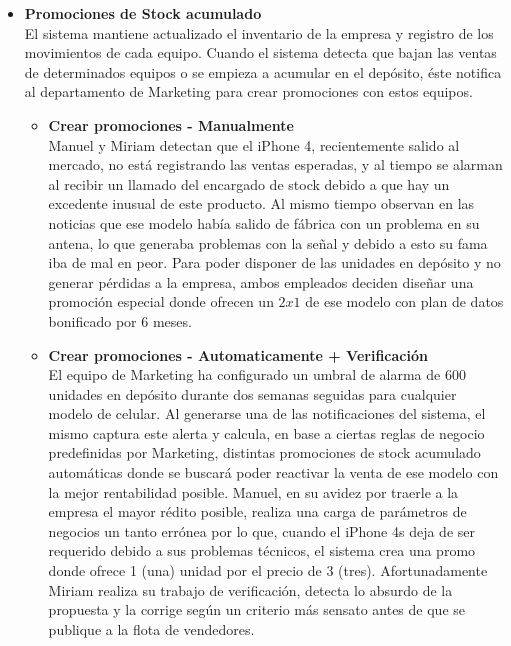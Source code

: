 \begin{itemize}
  \item \textbf{Promociones de Stock acumulado} \\
    El sistema mantiene actualizado el inventario de la empresa y registro de los movimientos de cada equipo. Cuando el sistema detecta que bajan las ventas de determinados equipos o se empieza a acumular en el depósito, éste notifica al departamento de Marketing para crear promociones con estos equipos.
  \begin{itemize}
    \item \textbf{Crear promociones - Manualmente} \\
      Manuel y Miriam detectan que el iPhone 4, recientemente salido al mercado, no está registrando las ventas esperadas, y al tiempo se alarman al recibir un llamado del encargado de stock debido a que hay un excedente inusual de este producto. Al mismo tiempo observan en las noticias que ese modelo había salido de fábrica con un problema en su antena, lo que generaba problemas con la señal y debido a esto su fama iba de mal en peor. Para poder disponer de las unidades en depósito y no generar pérdidas a la empresa, ambos empleados deciden diseñar una promoción especial donde ofrecen un $2x1$ de ese modelo con plan de datos bonificado por 6 meses.
    \item \textbf{Crear promociones - Automaticamente + Verificación} \\
      El equipo de Marketing ha configurado un umbral de alarma de 600 unidades en depósito durante dos semanas seguidas para cualquier modelo de celular. Al generarse una de las notificaciones del sistema, el mismo captura este alerta y calcula, en base a ciertas reglas de negocio predefinidas por Marketing, distintas promociones de stock acumulado automáticas donde se buscará poder reactivar la venta de ese modelo con la mejor rentabilidad posible. Manuel, en su avidez por traerle a la empresa el mayor rédito posible, realiza una carga de parámetros de negocios un tanto errónea por lo que, cuando el iPhone 4s deja de ser requerido debido a sus problemas técnicos, el sistema crea una promo donde ofrece 1 (una) unidad por el precio de 3 (tres). Afortunadamente Miriam realiza su trabajo de verificación, detecta lo absurdo de la propuesta y la corrige según un criterio más sensato antes de que se publique a la flota de vendedores.
  \end{itemize}


\end{itemize}
